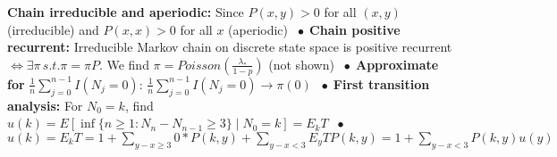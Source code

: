 \documentclass[9pt]{extarticle}
\newcommand*\bspace{$\; \bullet \;$}
\begin{document}
\textbf{Chain irreducible and aperiodic:} Since $P(x,y) > 0$ for all $(x,y)$ (irreducible) and $P(x,x) > 0$ for all $x$ (aperiodic) \bspace \textbf{Chain positive recurrent:} Irreducible Markov chain on discrete state space is positive recurrent $\Longleftrightarrow \exists \pi \, s.t. \pi = \pi P$. We find $\pi = Poisson(\frac{\lambda_*}{1 - p})$ (not shown) \bspace \textbf{Approximate for} $\frac{1}{n}\sum_{j=0}^{n-1}I(N_j = 0)$: $\frac{1}{n}\sum_{j=0}^{n-1}I(N_j = 0) \rightarrow \pi(0)$ \bspace \textbf{First transition analysis:} For $N_0 = k$, find $u(k) = E[\inf\{n\geq 1 : N_n - N_{n-1} \geq 3\} \mid N_0 = k] = E_kT$ \bspace $u(k) = E_kT = 1 + \sum_{y - x \geq 3}0 * P(k, y) + \sum_{y - x < 3} E_yTP(k,y) = 1 + \sum_{y-x<3}P(k,y)u(y)$


\end{document}
